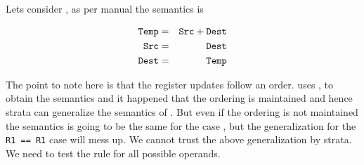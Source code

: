 Lets consider , as per manual the semantics is

\begin{eqnarray*}
  {\tt Temp} &=& {\tt Src} + {\tt Dest} \\
  {\tt Src} &=& {\tt Dest} \\
  {\tt Dest} &=& {\tt Temp} \\
\end{eqnarray*}

The point to note here is that the register updates follow an order.  \Strata
uses , to obtain the semantics and it happened that
the ordering is maintained and hence strata can generalize the semantics of
. But even if the ordering is not maintained the
semantics is going to be the same for the case , but the generalization
for the \texttt{R1\ ==\ R1} case will mess up.  We cannot trust the above
generalization by strata. We need to test the \K rule for all possible operands.


